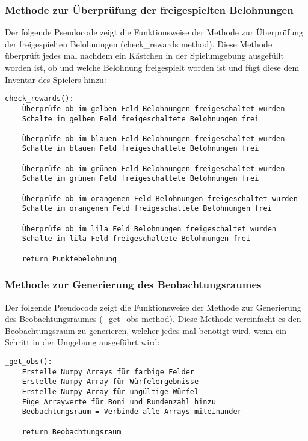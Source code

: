 \subsubsection{Methode zur Überprüfung der freigespielten Belohnungen}
\begin{minipage}{\linewidth}
Der folgende Pseudocode zeigt die Funktionsweise der Methode zur Überprüfung der freigespielten Belohnungen (check\_rewards method). Diese Methode überprüft jedes mal nachdem ein Kästchen in der Spielumgebung ausgefüllt worden ist, ob und welche Belohnung freigespielt worden ist und fügt diese dem Inventar des Spielers hinzu:
\vspace{0.5cm}
\begin{lstlisting}[caption={Methode zur Überprüfung der freigespielten Belohnungen}]
check_rewards():
	Überprüfe ob im gelben Feld Belohnungen freigeschaltet wurden
	Schalte im gelben Feld freigeschaltete Belohnungen frei
	
	Überprüfe ob im blauen Feld Belohnungen freigeschaltet wurden
	Schalte im blauen Feld freigeschaltete Belohnungen frei
	
	Überprüfe ob im grünen Feld Belohnungen freigeschaltet wurden
	Schalte im grünen Feld freigeschaltete Belohnungen frei
	
	Überprüfe ob im orangenen Feld Belohnungen freigeschaltet wurden
	Schalte im orangenen Feld freigeschaltete Belohnungen frei
	
	Überprüfe ob im lila Feld Belohnungen freigeschaltet wurden
	Schalte im lila Feld freigeschaltete Belohnungen frei
	
	return Punktebelohnung
\end{lstlisting}
\end{minipage}

\subsubsection{Methode zur Generierung des Beobachtungsraumes}
\begin{minipage}{\linewidth}
Der folgende Pseudocode zeigt die Funktionsweise der Methode zur Generierung des Beobachtungsraumes (\_get\_obs method). Diese Methode vereinfacht es den Beobachtungsraum zu generieren, welcher jedes mal benötigt wird, wenn ein Schritt in der Umgebung ausgeführt wird:
\vspace{0.5cm}
\begin{lstlisting}[caption={Methode zur Generierung des Beobachtungsraumes}]
_get_obs():
	Erstelle Numpy Arrays für farbige Felder
	Erstelle Numpy Array für Würfelergebnisse
	Erstelle Numpy Array für ungültige Würfel
	Füge Arraywerte für Boni und Rundenzahl hinzu
	Beobachtungsraum = Verbinde alle Arrays miteinander
	
	return Beobachtungsraum
\end{lstlisting}
\end{minipage}

